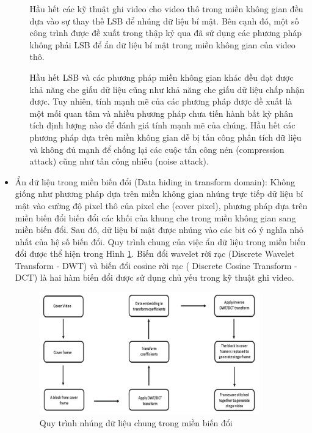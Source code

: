 \begin{itemize}
\begin{itemize}
Hầu hết các kỹ thuật ghi video cho video thô trong miền không gian đều dựa vào sự thay thế LSB để nhúng dữ liệu bí mật. Bên cạnh đó, một số công trình được đề xuất trong thập kỷ qua đã sử dụng các phương pháp không phải LSB để ẩn dữ liệu bí mật trong miền không gian của video thô.


Hầu hết LSB và các phương pháp miền không gian khác đều đạt được khả năng che giấu dữ liệu cũng như khả năng che giấu dữ liệu chấp nhận được. Tuy nhiên, tính mạnh mẽ của các phương pháp được đề xuất là một mối quan tâm và nhiều phương pháp chưa tiến hành bất kỳ phân tích định lượng nào để đánh giá tính mạnh mẽ của chúng. Hầu hết các phương pháp dựa trên miền không gian dễ bị tấn công phân tích dữ liệu và không đủ mạnh để chống lại các cuộc tấn công nén (compression attack) cũng như tấn công nhiễu (noise attack).

    \end{itemize}
    \item Ẩn dữ liệu trong miền biến đổi (Data hiding in transform domain):
    Không giống như phương pháp dựa trên miền không gian nhúng trực tiếp dữ liệu bí mật vào cường độ pixel thô của pixel che (cover pixel), phương pháp dựa trên miền biến đổi biến đổi các khối của khung che trong miền không gian sang miền biến đổi. Sau đó, dữ liệu bí mật được nhúng vào các bit có ý nghĩa nhỏ nhất của hệ số biến đổi. Quy trình chung của việc ẩn dữ liệu trong miền biến đổi được thể hiện trong Hình \ref{fig:Process_transform}. Biến đổi wavelet rời rạc (Discrete Wavelet Transform - DWT) và biến đổi cosine rời rạc ( Discrete Cosine Transform - DCT) là hai hàm biến đổi được sử dụng chủ yếu trong kỹ thuật ghi video.

\begin{figure}[!h]
    \centering
    \includegraphics[width=0.9\textwidth]{graphics/chapter-1/transform_overview.PNG}
    \caption{Quy trình nhúng dữ liệu chung trong miền biến đổi}
    \label{fig:Process_transform}
\end{figure}


\end{itemize}
